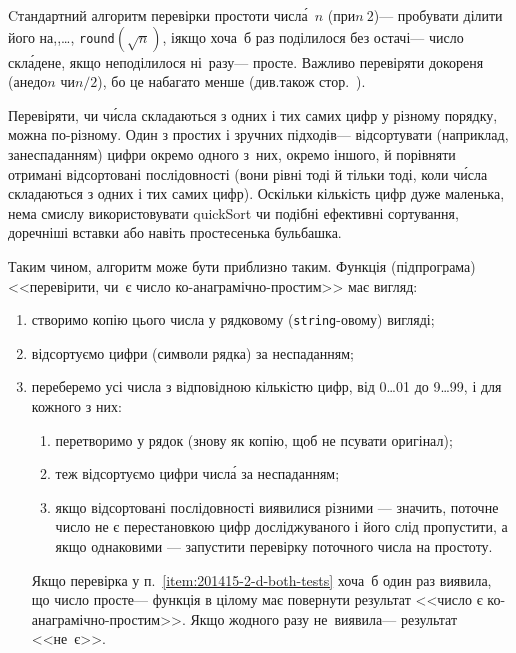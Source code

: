 \documentclass[14pt,a4paper]{extarticle}
\begin{document}
Cтандартний алгоритм перевірки простоти числ\'{а}~$n$ (при\nolinebreak[2] $n\>2$)\nolinebreak[3] --- пробувати ділити його на,,\nolinebreak[3] \dots, \verb"round"$(\sqrt{n})$, і\nolinebreak[3] якщо хоча~б раз поділилося без остачі\nolinebreak[3] --- число скл\'{а}дене, якщо не\nolinebreak[3] поділилося ні~разу\nolinebreak[3] --- просте. Важливо перевіряти до\nolinebreak[2] кореня (а\nolinebreak[3] не\nolinebreak[2] до\nolinebreak[3] $n$ чи\nolinebreak[2] $n/2$), бо це набагато менше (див.\nolinebreak[2] також стор.~\pageref{text:about-sqrt-n-in-divisors-list}).

Перевіряти, чи ч\'{и}сла складаються з одних і тих самих цифр у різному порядку, можна по-різному. Один з простих і зручних підходів\nolinebreak[3] --- відсортувати (наприклад, за\nolinebreak[3] неспаданням) цифри окремо одного з~них, окремо іншого, й порівняти отримані відсортовані послідовності (вони рівні тоді й тільки тоді, коли ч\'{и}сла складаються з одних і тих самих цифр). Оскільки кількість цифр дуже маленька, нема смислу використовувати quickSort чи подібні ефективні сортування, доречніші вставки або навіть простесенька бульбашка.

Таким чином, алгоритм може бути приблизно таким. 
Функція (підпрограма) <<перевірити, чи~є число ко-анаграмічно-простим>> має вигляд:

\begin{enumerate}
\item
створимо копію цього числа у рядковому (\texttt{string}-овому) вигляді;
\item
відсортуємо цифри (символи рядка) за неспаданням;
\item
переберемо усі числа з відповідною кількістю цифр, від 0\dots01 до 9\dots99, і для кожного з них:
\begin{enumerate}
\item
перетворимо у рядок (знову як копію, щоб не псувати оригінал);
\item
теж відсортуємо цифри числ\'{а} за неспаданням;
\item \label{item:201415-2-d-both-tests}
якщо відсортовані послідовності виявилися різними --- значить, поточне число не є перестановкою цифр досліджуваного і його слід пропустити, а якщо однаковими --- запустити перевірку поточного числа на простоту.
\end{enumerate}
Якщо перевірка у п.~\ref{item:201415-2-d-both-tests} хоча~б один раз виявила, що число просте\nolinebreak[3] --- функція в цілому має повернути результат <<число є ко-ана\-гра\-мічно-простим>>. Якщо жодного разу не~виявила\nolinebreak[3] --- результат <<не~є>>.
\end{enumerate}
\end{document}
